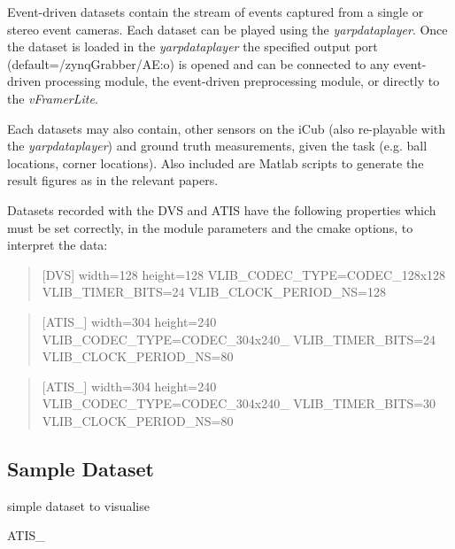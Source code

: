 Event-\/driven datasets contain the stream of events captured from a single or stereo event cameras. Each dataset can be played using the {\itshape yarpdataplayer}. Once the dataset is loaded in the {\itshape yarpdataplayer} the specified output port (default=/zynq\+Grabber/\+AE\+:o) is opened and can be connected to any event-\/driven processing module, the event-\/driven preprocessing module, or directly to the {\itshape v\+Framer\+Lite}.

Each datasets may also contain, other sensors on the i\+Cub (also re-\/playable with the {\itshape yarpdataplayer}) and ground truth measurements, given the task (e.\+g. ball locations, corner locations). Also included are Matlab scripts to generate the result figures as in the relevant papers.

Datasets recorded with the D\+VS and A\+T\+IS have the following properties which must be set correctly, in the module parameters and the cmake options, to interpret the data\+: \begin{quote}
\mbox{[}D\+VS\mbox{]} width=128 height=128 V\+L\+I\+B\+\_\+\+C\+O\+D\+E\+C\+\_\+\+T\+Y\+PE=C\+O\+D\+E\+C\+\_\+128x128 V\+L\+I\+B\+\_\+\+T\+I\+M\+E\+R\+\_\+\+B\+I\+TS=24 V\+L\+I\+B\+\_\+\+C\+L\+O\+C\+K\+\_\+\+P\+E\+R\+I\+O\+D\+\_\+\+NS=128 \end{quote}


\begin{quote}
\mbox{[}A\+T\+I\+S\+\_\mbox{]} width=304 height=240 V\+L\+I\+B\+\_\+\+C\+O\+D\+E\+C\+\_\+\+T\+Y\+PE=C\+O\+D\+E\+C\+\_\+304x240\+\_ V\+L\+I\+B\+\_\+\+T\+I\+M\+E\+R\+\_\+\+B\+I\+TS=24 V\+L\+I\+B\+\_\+\+C\+L\+O\+C\+K\+\_\+\+P\+E\+R\+I\+O\+D\+\_\+\+NS=80 \end{quote}


\begin{quote}
\mbox{[}A\+T\+I\+S\+\_\mbox{]} width=304 height=240 V\+L\+I\+B\+\_\+\+C\+O\+D\+E\+C\+\_\+\+T\+Y\+PE=C\+O\+D\+E\+C\+\_\+304x240\+\_ V\+L\+I\+B\+\_\+\+T\+I\+M\+E\+R\+\_\+\+B\+I\+TS=30 V\+L\+I\+B\+\_\+\+C\+L\+O\+C\+K\+\_\+\+P\+E\+R\+I\+O\+D\+\_\+\+NS=80 \end{quote}


\subsection*{Sample Dataset}


\begin{DoxyItemize}
\item simple dataset to visualise
\item A\+T\+I\+S\+\_
\end{DoxyItemize}

